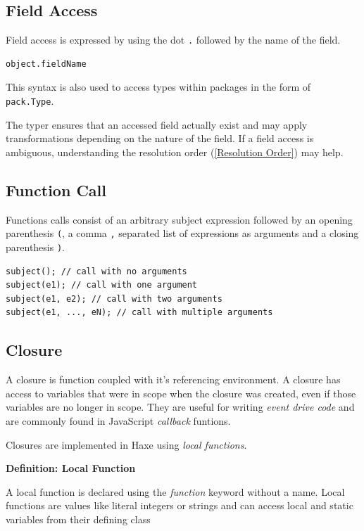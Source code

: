 \documentclass{article}
\newcommand{\expr}[1]{\texttt{#1}}
\newenvironment{myshaded}
  {\def\FrameCommand{\fboxsep=\topsep\colorbox{bgcolor}}%
  \MakeFramed {\advance\hsize-\width \FrameRestore}}%
 {\endMakeFramed}
\newcommand{\define}[3][Definition]
	{\begin{myshaded}\noindent\textbf{#1: #2}\par\nobreak\noindent\ignorespaces#3\label{def:#2}\end{myshaded}}
\newcommand{\tref}[2]{#1 (\ref{#2})}
\begin{document}
\subsection{Field Access}
\label{Field Access}

Field access is expressed by using the dot \expr{.} followed by the name of the field.

\begin{lstlisting}
object.fieldName
\end{lstlisting}

This syntax is also used to access types within packages in the form of \expr{pack.Type}. 

The typer ensures that an accessed field actually exist and may apply transformations depending on the nature of the field. If a field access is ambiguous, understanding the \tref{resolution order}{Resolution Order} may help.


\subsection{Function Call}

Functions calls consist of an arbitrary subject expression followed by an opening parenthesis \expr{(}, a comma \expr{,} separated list of expressions as arguments and a closing parenthesis \expr{)}.

\begin{lstlisting}
subject(); // call with no arguments
subject(e1); // call with one argument
subject(e1, e2); // call with two arguments
subject(e1, ..., eN); // call with multiple arguments
\end{lstlisting}




\subsection{Closure}
\label{Closure}
\label{function}
A closure is function coupled with it's referencing environment.  A closure has access to variables that were in scope when the closure was created, even if those variables are no longer in scope.  They are useful for writing \emph{event drive code} and are commonly found in JavaScript \emph{callback} funtions.  

Closures are implemented in Haxe using \emph{local functions}.

\define{Local Function}{A local function is declared using the \emph{function} keyword without a name.  Local functions are values like literal integers or strings and can access local and static variables from their defining class}
\end{document}
